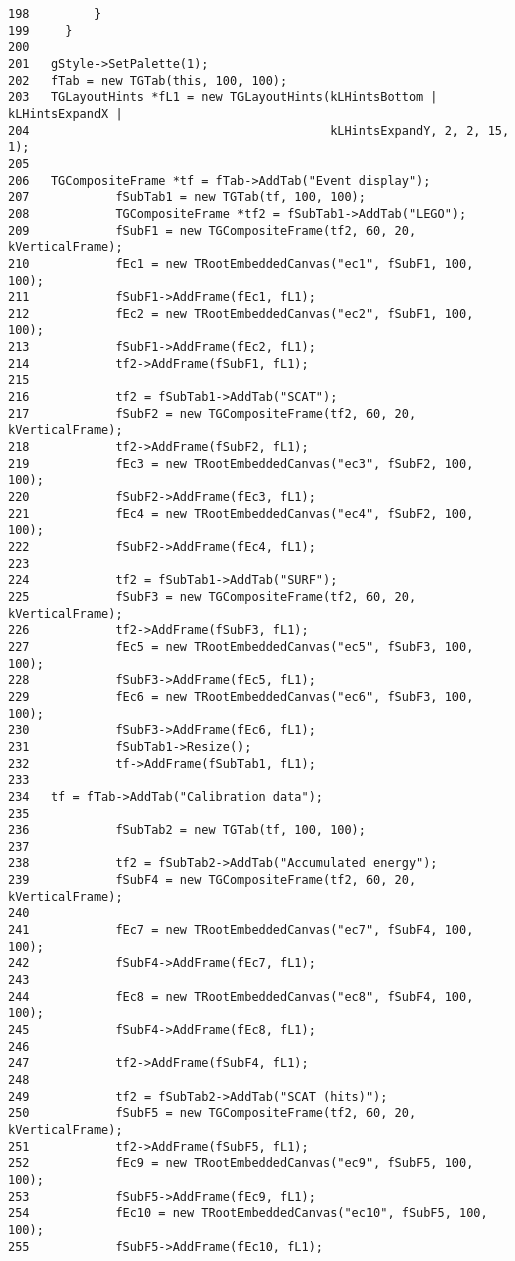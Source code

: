 \begin{verbatim}
198         }
199     }
200 
201   gStyle->SetPalette(1);
202   fTab = new TGTab(this, 100, 100);
203   TGLayoutHints *fL1 = new TGLayoutHints(kLHintsBottom | kLHintsExpandX |
204                                          kLHintsExpandY, 2, 2, 15, 1);
205 
206   TGCompositeFrame *tf = fTab->AddTab("Event display");
207            fSubTab1 = new TGTab(tf, 100, 100);
208            TGCompositeFrame *tf2 = fSubTab1->AddTab("LEGO");  
209            fSubF1 = new TGCompositeFrame(tf2, 60, 20, kVerticalFrame);
210            fEc1 = new TRootEmbeddedCanvas("ec1", fSubF1, 100, 100);
211            fSubF1->AddFrame(fEc1, fL1);
212            fEc2 = new TRootEmbeddedCanvas("ec2", fSubF1, 100, 100);
213            fSubF1->AddFrame(fEc2, fL1);
214            tf2->AddFrame(fSubF1, fL1);
215 
216            tf2 = fSubTab1->AddTab("SCAT"); 
217            fSubF2 = new TGCompositeFrame(tf2, 60, 20, kVerticalFrame);
218            tf2->AddFrame(fSubF2, fL1);
219            fEc3 = new TRootEmbeddedCanvas("ec3", fSubF2, 100, 100);
220            fSubF2->AddFrame(fEc3, fL1);
221            fEc4 = new TRootEmbeddedCanvas("ec4", fSubF2, 100, 100);
222            fSubF2->AddFrame(fEc4, fL1);
223 
224            tf2 = fSubTab1->AddTab("SURF"); 
225            fSubF3 = new TGCompositeFrame(tf2, 60, 20, kVerticalFrame);
226            tf2->AddFrame(fSubF3, fL1);
227            fEc5 = new TRootEmbeddedCanvas("ec5", fSubF3, 100, 100);
228            fSubF3->AddFrame(fEc5, fL1);
229            fEc6 = new TRootEmbeddedCanvas("ec6", fSubF3, 100, 100);
230            fSubF3->AddFrame(fEc6, fL1);
231            fSubTab1->Resize();
232            tf->AddFrame(fSubTab1, fL1);
233 
234   tf = fTab->AddTab("Calibration data");
235      
236            fSubTab2 = new TGTab(tf, 100, 100);
237 
238            tf2 = fSubTab2->AddTab("Accumulated energy");   
239            fSubF4 = new TGCompositeFrame(tf2, 60, 20, kVerticalFrame);
240 
241            fEc7 = new TRootEmbeddedCanvas("ec7", fSubF4, 100, 100);
242            fSubF4->AddFrame(fEc7, fL1);
243 
244            fEc8 = new TRootEmbeddedCanvas("ec8", fSubF4, 100, 100);
245            fSubF4->AddFrame(fEc8, fL1);
246 
247            tf2->AddFrame(fSubF4, fL1);
248            
249            tf2 = fSubTab2->AddTab("SCAT (hits)"); 
250            fSubF5 = new TGCompositeFrame(tf2, 60, 20, kVerticalFrame);
251            tf2->AddFrame(fSubF5, fL1);
252            fEc9 = new TRootEmbeddedCanvas("ec9", fSubF5, 100, 100);
253            fSubF5->AddFrame(fEc9, fL1);
254            fEc10 = new TRootEmbeddedCanvas("ec10", fSubF5, 100, 100);
255            fSubF5->AddFrame(fEc10, fL1);

\end{verbatim}
